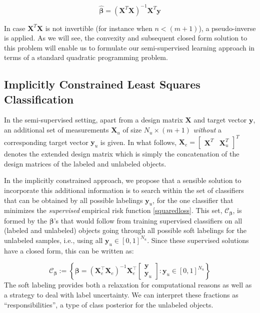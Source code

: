 \documentclass{elsarticle}
\newcommand{\Xe}{\mathbf{X}_e  }
\newcommand{\XeT}{\mathbf{X}_e^{\top}}
\newcommand{\ye}{\begin{bmatrix} \mathbf{y}  \\ \mathbf{y}_u \end{bmatrix}}
\begin{document}
\begin{equation} \label{olssolution}
\boldsymbol{\hat{\beta}}=\left(\mathbf{X}^T \mathbf{X}\right)^{-1} \mathbf{X}^T \mathbf{y}
\end{equation}

In case $\textbf{X}^T \textbf{X}$ is not invertible (for instance when $n<(m+1)$), a pseudo-inverse is applied. As we will see, the convexity and subsequent closed form solution to this problem will enable us to formulate our semi-supervised learning approach in terms of a standard quadratic programming problem.

\subsection{Implicitly Constrained Least Squares Classification} \label{section:icls}

In the semi-supervised setting, apart from a design matrix $\textbf{X}$ and target vector $\textbf{y}$, an additional set of measurements $\textbf{X}_u$ of size $N_u \times (m+1)$ \emph{without} a corresponding target vector $\textbf{y}_u$ is given. In what follows, $\mathbf{X}_e=\begin{bmatrix} \mathbf{X}^T  & \mathbf{X}_u^T \end{bmatrix}^T$ denotes the extended design matrix which is simply the concatenation of the design matrices of the labeled and unlabeled objects.

In the implicitly constrained approach, we propose that a sensible solution to incorporate this additional information is to search within the set of classifiers that can be obtained by all possible labelings $\textbf{y}_u$, for the one classifier that minimizes the \emph{supervised} empirical risk function \eqref{squaredloss}. This set, $\mathcal{C}_{\boldsymbol{\beta}}$, is formed by the $\boldsymbol{\beta}$'s that would follow from training supervised classifiers on all (labeled and unlabeled) objects going through all possible soft labelings for the unlabeled samples, i.e., using all $\textbf{y}_u \in [0,1]^{N_u}$. Since these supervised solutions have a closed form, this can be written as:

\begin{equation} \label{constrainedregion}
\mathcal{C}_{\boldsymbol{\beta}} := \left\{   \boldsymbol{\beta} = \left( {\XeT} {\Xe} \right)^{-1} {\XeT} \ye: \mathbf{y}_u \in [0,1]^{N_u} \right\}
\end{equation}
The soft labeling provides both a relaxation for computational reasons as well as a strategy to deal with label uncertainty. We can interpret these fractions as ``responsibilities'', a type of class posterior for the unlabeled objects. 
\end{document}
